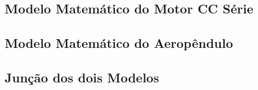 \subsection{Modelo Matemático do Motor CC Série}




\subsection{ Modelo Matemático do Aeropêndulo}




\subsection{Junção dos dois Modelos}
